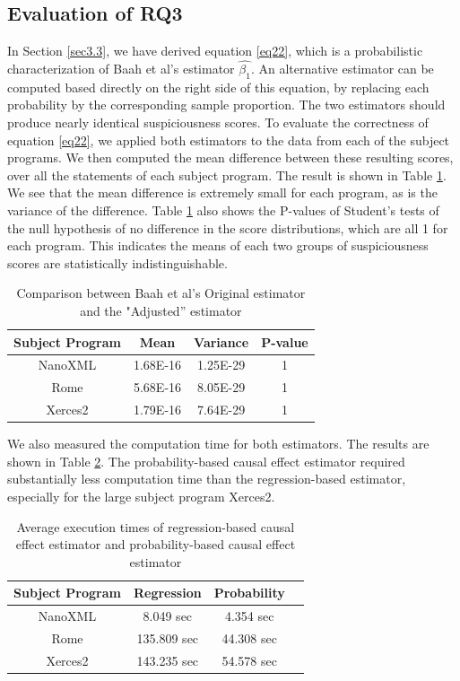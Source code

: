 \subsection{Evaluation of RQ3}
In Section \ref{sec3.3}, we have derived equation \eqref{eq22}, which is a probabilistic characterization of Baah et al’s estimator $\widehat{\beta_1}$.  An alternative estimator can be computed based directly on the right side of this equation, by replacing each probability by the corresponding sample proportion.  The two estimators should produce nearly identical suspiciousness scores.  To evaluate the correctness of equation \eqref{eq22}, we applied both estimators to the data from each of the subject programs.  We then computed the mean difference between these resulting scores, over all the statements of each subject program.  The result is shown in Table \ref{table4}.  We see that the mean difference is extremely small for each program, as is the variance of the difference.  Table \ref{table4} also shows the P-values of Student’s  tests of the null hypothesis of no difference in the score distributions, which are all 1 for each program. This indicates the means of each two groups of suspiciousness scores are statistically indistinguishable.

\begin{table}
\caption{Comparison between Baah et al’s  Original estimator and the "Adjusted” estimator}\label{table4}
\centering
\begin{tabular}{|c|c|c|c|}
\hline
Subject Program	&	Mean	&	Variance	&	P-value	\\ \hline
NanoXML 	&	1.68E-16	&	1.25E-29	&	1	\\ \hline
Rome 	&	5.68E-16	&	8.05E-29	&	1	\\ \hline
Xerces2 	&	1.79E-16	&	7.64E-29	&	1	\\ \hline

\end{tabular}
\end{table}

We also measured the computation time for both estimators. The results are shown in Table \ref{table5}.  The probability-based causal effect estimator required substantially less computation time than the regression-based estimator, especially for the large subject program Xerces2.  

\begin{table}
\caption{Average execution times of regression-based causal effect estimator and probability-based causal effect estimator}\label{table5}
\centering
\begin{tabular}{|c|c|c|c|}
\hline
Subject Program	&	Regression	&	Probability	\\ \hline
NanoXML 	&	8.049 sec	&	4.354 sec	\\ \hline
Rome 	&	135.809 sec	&	44.308 sec	\\ \hline
Xerces2 	&	143.235 sec	&	54.578 sec	\\ \hline

\end{tabular}
\end{table}

